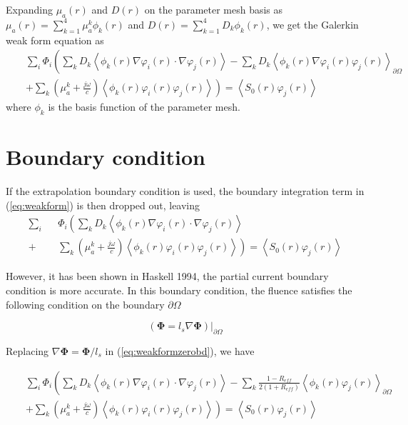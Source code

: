 \documentclass{article}
\begin{document}
Expanding $\mu_a(r)$ and $D(r)$ on the parameter mesh basis as
$\mu_a(r)=\sum_{k=1}^{4}\mu_a^k\phi_k(r)$ and
$D(r)=\sum_{k=1}^{4}D_k\phi_k(r)$, we get the Galerkin weak form
equation as
\begin{eqnarray}
\label{eq:weakform}\nonumber&&\sum_{i}\Phi_i\left(\sum_{k}D_k\left\langle
\phi_k(r)\nabla\varphi_i(r)\cdot\nabla\varphi_j(r)\right\rangle -
\sum_{k}D_k\left\langle
\phi_k(r)\nabla\varphi_i(r)\varphi_j(r)\right\rangle_{\partial\Omega}\right.
\\&&\left.+\sum_{k}\left(\mu_{a}^k+\frac{j\omega}{c}\right)\left\langle\phi_k(r)\varphi_i(r)\varphi_j(r)\right\rangle\right)=\left\langle
S_0(r)\varphi_j(r)\right\rangle
\end{eqnarray}
where $\phi_k$ is the basis function of the parameter mesh.

\section{Boundary condition}

If the extrapolation boundary condition is used, the boundary
integration term in (\ref{eq:weakform}) is then dropped out,
leaving
\begin{eqnarray}
\label{eq:weakformzerobd}\sum_{i}&&\Phi_i\left(\sum_{k}D_k\left\langle
\phi_k(r)\nabla\varphi_i(r)\cdot\nabla\varphi_j(r)\right\rangle\right.\\\nonumber
+&&\left.\sum_{k}\left(\mu_{a}^k+\frac{j\omega}{c}\right)\left\langle\phi_k(r)\varphi_i(r)\varphi_j(r)\right\rangle\right)=\left\langle
S_0(r)\varphi_j(r)\right\rangle
\end{eqnarray}

However, it has been shown in Haskell 1994, the partial current boundary
condition is more accurate. In this boundary condition, the fluence
satisfies the following condition on the boundary $\partial\Omega$

\begin{equation}
\label{eq:partialcurrent} \left(\boldsymbol\Phi=l_s\nabla{\boldsymbol\Phi}\right)|_{\partial\Omega}
\end{equation}

Replacing $\nabla{\boldsymbol\Phi}=\boldsymbol\Phi/l_s$ in (\ref{eq:weakformzerobd}), we
have

\begin{eqnarray}
\label{eq:weakformpartial}\nonumber&&\sum_{i}\Phi_i\left(\sum_{k}D_k\left\langle
\phi_k(r)\nabla\varphi_i(r)\cdot\nabla\varphi_j(r)\right\rangle -
\sum_{k}\frac{1-R_{eff}}{2(1+R_{eff})}\left\langle
\phi_k(r)\varphi_j(r)\right\rangle_{\partial\Omega}\right.
\\&&\left.+\sum_{k}\left(\mu_{a}^k+\frac{j\omega}{c}\right)\left\langle\phi_k(r)\varphi_i(r)\varphi_j(r)\right\rangle\right)=\left\langle
S_0(r)\varphi_j(r)\right\rangle
\end{eqnarray}
\end{document}
